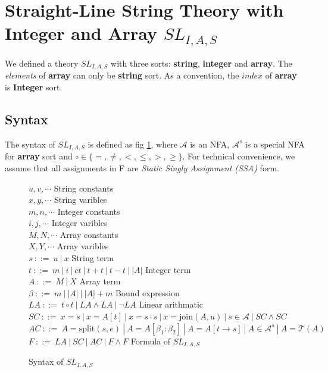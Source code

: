 \documentclass[12pt]{article}
\theoremstyle{remark}
\begin{document}
\section{Straight-Line String Theory with Integer and Array $SL_{I,A,S} $}
We defined a theory $SL_{I,A,S}$ with three sorts: \textbf{string}, \textbf{integer} and \textbf{array}. The \textit{elements} of \textbf{array} can only be \textbf{string} sort. As a convention, the $index$ of \textbf{array} is \textbf{Integer} sort.
\subsection{Syntax}
The syntax of $SL_{I,A,S}$ is defined as fig \ref{fig:syntax}, where $\mathcal{A}$ is an NFA, $\mathcal{A}^s $ is a special NFA for \textbf{array} sort and $\circ \in \{=,\not=, <, \leq, >, \geq \}$. For technical convenience, we assume that all assignments in F are \textit{Static Singly Assignment (SSA)} form.
\begin{figure}[H]
    $u,v,\cdots$  \hfill{String constants}\\
    $x,y,\cdots$  \hfill{String varibles}\\
    $m,n,\cdots$  \hfill{Integer constants}\\
    $i,j,\cdots$  \hfill{Integer varibles}\\
    $M,N,\cdots$  \hfill{Array constants}\\
    $X,Y,\cdots$  \hfill{Array varibles}\\ 

    $s \ ::= \ u \ |\ x$ \hfill{String term}\\
    $t \ ::= \  m \ |\ i \ |\ ct \ |\ t+t \ |\ t-t \ |\ |A| $ \hfill{Integer term}\\
    $A \ ::= \  M \ |\ X  $ \hfill{Array term}\\
    $\beta \ ::= \  m \ |\ |A| \ |\ |A|+m  $  \hfill{Bound expression}\\

    $LA \ ::= \ t\circ t \ |\ LA\wedge LA \ |\ \neg LA $  \hfill{Linear arithmatic}\\
    $SC \ ::= \ x=s \ |\ x=A[t] \ |\ x=s\cdot s \ |\ x=\mathrm{join}(A,u) \ |\ s\in\mathcal{A} \ |\ SC\wedge SC $   \\
    $AC \ ::= \ A = \mathrm{split}(s,e) \ |\ A = A[\beta_1:\beta_2] \ |\ A = A[t\rightarrow s] \ |\ A\in \mathcal{A}^s \ |\ A = \mathcal{T}(A) $ \\ 
    $F \ ::= \  LA \ |\ SC \ |\ AC \ |\ F\wedge F $ \hfill{Formula of $SL_{I,A,S} $}
    \caption{Syntax of $SL_{I,A,S}$}
    \label{fig:syntax}
\end{figure}
\end{document}
